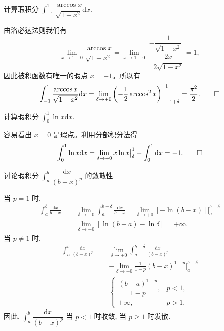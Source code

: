 \begin{example}\label{example:ma-8-3-1}
计算瑕积分 $\int_{-1}^1\dfrac{\arccos x}{\sqrt{1-x^2}}\mathrm dx$.
\end{example}


\begin{solve}
由洛必达法则我们有
\[
  \lim_{x\to1-0}\frac{\arccos x}{\sqrt{1-x^2}}
  =
  \lim_{x\to1-0}
  \frac{-\dfrac1{\sqrt{1-x^2}}}{-\dfrac{2x}{2\sqrt{1-x^2}}}
  =
  1,
\]
因此被积函数有唯一的瑕点 $x=-1$。所以有
\[
  \int_{-1}^1\frac{\arccos x}{\sqrt{1-x^2}}\mathrm dx
  =
  \lim_{\delta\to+0}\left(-\frac12\arccos^2x\right)\bigg|_{-1+\delta}^1
  =
  \frac{\pi^2}{2}.
\qedhere
\]
\end{solve}


\begin{example}\label{example:ma-8-3-2}
计算瑕积分 $\int_0^1\ln x\mathrm dx$.
\end{example}


\begin{solve}
容易看出 $x=0$ 是瑕点。利用分部积分法得
\[
  \int_0^1\ln x\mathrm dx
  =
  \lim_{\delta\to+0}x\ln x\big|_\delta^1
  -
  \int_0^1\mathrm dx
  =
  -1.
\qedhere
\]
\end{solve}


\begin{example}\label{example:ma-8-3-3}
讨论瑕积分 $\int_a^b\dfrac{\mathrm dx}{(b-x)^p}$ 的敛散性.
\end{example}


\begin{solve}[{解法 1}]
当 $p=1$ 时,
\[
\begin{aligned}
  \int_a^b\frac{\mathrm dx}{b-x}
  &=
  \lim_{\delta\to+0}\int_a^{b-\delta}\frac{\mathrm dx}{b-x}
  =
  \lim_{\delta\to+0}[-\ln(b-x)]\big|_a^{b-\delta}\\
  &=
  \lim_{\delta\to+0}[\ln(b-a)-\ln\delta]=+\infty.
\end{aligned}
\]
当 $p\ne1$ 时,
\[
\begin{aligned}
  \int_a^b\frac{\mathrm dx}{(b-x)^p}
  &=
  \lim_{\delta\to+0}\int_a^{b-\delta}\frac{\mathrm dx}{(b-x)^p}\\
  &=
  -\lim_{\delta\to+0}\frac1{1-p}(b-x)^{1-p}\bigg|_a^{b-\delta}\\
  &=
  \begin{cases}
    \dfrac{(b-a)^{1-p}}{1-p}, & p<1,\\
    +\infty, & p>1.
  \end{cases}
\end{aligned}
\]
因此, $\int_a^b\dfrac{\mathrm dx}{(b-x)^p}$ 当 $p<1$ 时收敛, 当 $p\geq1$ 时发散.
\end{solve}


